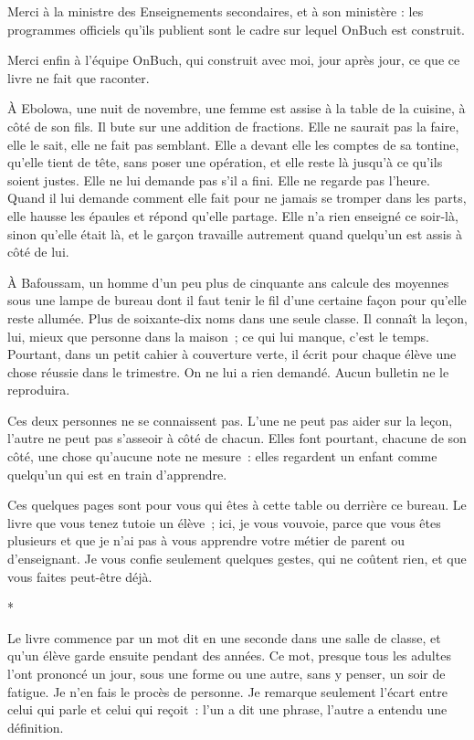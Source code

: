 \documentclass[10.5pt,twoside,openright]{book}
\newcommand{\asterisme}{\par\vspace{0.7em}\centerline{\color{gris}*\quad*\quad*}\vspace{0.7em}\par\noindent}
\newcommand{\chapitresn}[1]{\cleardoublepage\markright{#1}\thispagestyle{plain}\vspace*{2.8cm}{\noindent\LARGE\bfseries #1\par}\vspace{1.6em}\noindent\ignorespaces}
\begin{document}
Merci à la ministre des Enseignements secondaires, et à son ministère : les programmes officiels qu’ils publient sont le cadre sur lequel OnBuch est construit.

Merci enfin à l’équipe OnBuch, qui construit avec moi, jour après jour, ce que ce livre ne fait que raconter.


\chapitresn{Postface — Pour les parents et les enseignants}

À Ebolowa, une nuit de novembre, une femme est assise à la table de la cuisine, à côté de son fils. Il bute sur une addition de fractions. Elle ne saurait pas la faire, elle le sait, elle ne fait pas semblant. Elle a devant elle les comptes de sa tontine, qu’elle tient de tête, sans poser une opération, et elle reste là jusqu’à ce qu’ils soient justes. Elle ne lui demande pas s’il a fini. Elle ne regarde pas l’heure. Quand il lui demande comment elle fait pour ne jamais se tromper dans les parts, elle hausse les épaules et répond qu’elle partage. Elle n’a rien enseigné ce soir-là, sinon qu’elle était là, et le garçon travaille autrement quand quelqu’un est assis à côté de lui.

À Bafoussam, un homme d’un peu plus de cinquante ans calcule des moyennes sous une lampe de bureau dont il faut tenir le fil d’une certaine façon pour qu’elle reste allumée. Plus de soixante-dix noms dans une seule classe. Il connaît la leçon, lui, mieux que personne dans la maison ; ce qui lui manque, c’est le temps. Pourtant, dans un petit cahier à couverture verte, il écrit pour chaque élève une chose réussie dans le trimestre. On ne lui a rien demandé. Aucun bulletin ne le reproduira.

Ces deux personnes ne se connaissent pas. L’une ne peut pas aider sur la leçon, l’autre ne peut pas s’asseoir à côté de chacun. Elles font pourtant, chacune de son côté, une chose qu’aucune note ne mesure : elles regardent un enfant comme quelqu’un qui est en train d’apprendre.

Ces quelques pages sont pour vous qui êtes à cette table ou derrière ce bureau. Le livre que vous tenez tutoie un élève ; ici, je vous vouvoie, parce que vous êtes plusieurs et que je n’ai pas à vous apprendre votre métier de parent ou d’enseignant. Je vous confie seulement quelques gestes, qui ne coûtent rien, et que vous faites peut-être déjà.

\asterisme

Le livre commence par un mot dit en une seconde dans une salle de classe, et qu’un élève garde ensuite pendant des années. Ce mot, presque tous les adultes l’ont prononcé un jour, sous une forme ou une autre, sans y penser, un soir de fatigue. Je n’en fais le procès de personne. Je remarque seulement l’écart entre celui qui parle et celui qui reçoit : l’un a dit une phrase, l’autre a entendu une définition.
\end{document}
